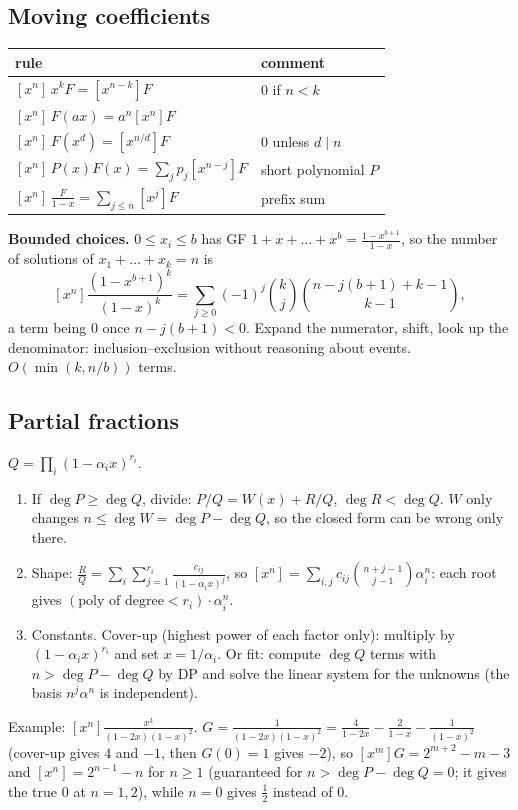 	\subsection{Moving coefficients}
	\begin{center}\small\renewcommand{\arraystretch}{1.3}
	\begin{tabular}{@{}l@{\ \ }l@{}}
	rule & comment \\ \hline
	$[x^n]\,x^kF=[x^{n-k}]F$ & $0$ if $n<k$ \\
	$[x^n]\,F(ax)=a^n[x^n]F$ & \\
	$[x^n]\,F(x^d)=[x^{n/d}]F$ & $0$ unless $d\mid n$ \\
	$[x^n]\,P(x)F(x)=\sum_jp_j[x^{n-j}]F$ & short polynomial $P$ \\
	$[x^n]\,\frac{F}{1-x}=\sum_{j\le n}[x^j]F$ & prefix sum \\
	\end{tabular}
	\end{center}
	\textbf{Bounded choices.} $0\le x_i\le b$ has GF $1+x+\dots+x^b=\frac{1-x^{b+1}}{1-x}$, so the number of solutions of $x_1+\dots+x_k=n$ is
	\[[x^n]\frac{(1-x^{b+1})^k}{(1-x)^k}=\sum_{j\ge0}(-1)^j\binom kj\binom{n-j(b+1)+k-1}{k-1},\]
	a term being $0$ once $n-j(b+1)<0$. Expand the numerator, shift, look up the denominator: inclusion--exclusion without reasoning about events. $O(\min(k,n/b))$ terms.

	\subsection{Partial fractions}
	$Q=\prod_i(1-\alpha_ix)^{r_i}$.
	\begin{enumerate}[nosep,leftmargin=*]
	\item If $\deg P\ge\deg Q$, divide: $P/Q=W(x)+R/Q$, $\deg R<\deg Q$. $W$ only changes $n\le\deg W=\deg P-\deg Q$, so the closed form can be wrong only there.
	\item Shape: $\frac RQ=\sum_i\sum_{j=1}^{r_i}\frac{c_{ij}}{(1-\alpha_ix)^j}$, so $[x^n]=\sum_{i,j}c_{ij}\binom{n+j-1}{j-1}\alpha_i^n$: each root gives $(\text{poly of degree}<r_i)\cdot\alpha_i^n$.
	\item Constants. Cover-up (highest power of each factor only): multiply by $(1-\alpha_ix)^{r_i}$ and set $x=1/\alpha_i$. Or fit: compute $\deg Q$ terms with $n>\deg P-\deg Q$ by DP and solve the linear system for the unknowns (the basis $n^j\alpha^n$ is independent).
	\end{enumerate}
	Example: $[x^n]\frac{x^3}{(1-2x)(1-x)^2}$. $G=\frac1{(1-2x)(1-x)^2}=\frac{4}{1-2x}-\frac{2}{1-x}-\frac{1}{(1-x)^2}$ (cover-up gives $4$ and $-1$, then $G(0)=1$ gives $-2$), so $[x^m]G=2^{m+2}-m-3$ and $[x^n]=2^{n-1}-n$ for $n\ge1$ (guaranteed for $n>\deg P-\deg Q=0$; it gives the true $0$ at $n=1,2$), while $n=0$ gives $\frac12$ instead of $0$.


